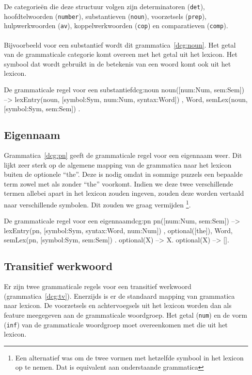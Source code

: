 De categorieën die deze structuur volgen zijn determinatoren (\texttt{det}), hoofdtelwoorden (\texttt{number}), substantieven (\texttt{noun}), voorzetsels (\texttt{prep}), hulpwerkwoorden (\texttt{av}), koppelwerkwoorden (\texttt{cop}) en comparatieven (\texttt{comp}).

\paragraph{}Bijvoorbeeld voor een substantief wordt dit grammatica~\ref{dcg:noun}. Het getal van de grammaticale categorie komt overeen met het getal uit het lexicon. Het symbool dat wordt gebruikt in de betekenis van een woord komt ook uit het lexicon.
\begin{dcg}{De grammaticale regel voor een substantief}{dcg:noun}
noun([num:Num, sem:Sem]) -->
  { lexEntry(noun, [symbol:Sym, num:Num, syntax:Word]) },
  Word,
  { semLex(noun, [symbol:Sym, sem:Sem]) }.
\end{dcg}

\subsection{Eigennaam}
Grammatica~\ref{dcg:pn} geeft de grammaticale regel voor een eigennaam weer. Dit lijkt zeer sterk op de algemene mapping van de grammatica naar het lexicon buiten de optionele ``the''. Deze is nodig omdat in sommige puzzels een bepaalde term zowel met als zonder ``the'' voorkomt. Indien we deze twee verschillende termen allebei apart in het lexicon zouden ingeven, zouden deze worden vertaald naar verschillende symbolen. Dit zouden we graag vermijden \footnote{Een alternatief was om de twee vormen met hetzelfde symbool in het lexicon op te nemen. Dat is equivalent aan onderstaande grammatica}.

\begin{dcg}{De grammaticale regel voor een eigennaam}{dcg:pn}
pn([num:Num, sem:Sem]) -->
  { lexEntry(pn, [symbol:Sym, syntax:Word, num:Num]) },
  optional([the]),
  Word,
  { semLex(pn, [symbol:Sym, sem:Sem]) }.
optional(X) -->
  X.
optional(X) -->
  [].
\end{dcg}

\subsection{Transitief werkwoord}
\label{sec:gramm-tv}
Er zijn twee grammaticale regels voor een transitief werkwoord (grammatica~\ref{dcg:tv}). Enerzijds is er de standaard mapping van grammatica naar lexicon. De voorzetsels en achtervoegsels uit het lexicon worden dan als feature meegegeven aan de grammaticale woordgroep. Het getal (\texttt{num}) en de vorm (\texttt{inf}) van de grammaticale woordgroep moet overeenkomen met die uit het lexicon.

